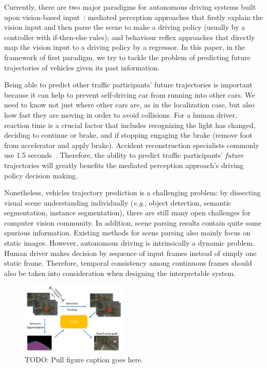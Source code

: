 \documentclass[10pt,twocolumn,letterpaper]{article}
\begin{document}

Currently, there are two major paradigms for autonomous driving systems built upon vision-based input~\cite{chen2015deepdriving}: mediated perception approaches that firstly explain the vision input and then parse the scene to make a driving policy (usually by a controller with if-then-else rules); and behaviour reflex approaches that directly map the vision input to a driving policy by a regressor.
In this paper, in the framework of first paradigm, we try to tackle the problem of predicting future trajectories of vehicles given its past information.


 Being able to predict other traffic participants' future trajectories is important because it can help to prevent self-driving car from running into other cars. We need to know not just where other cars are, as in the localization case, but also how fast they are moving in order to avoid collisions.
For a human driver, reaction time is a crucial factor that includes recognizing the light has changed, deciding to continue or brake, and if stopping engaging the brake (remove foot from accelerator and apply brake). Accident reconstruction specialists commonly use 1.5 seconds~\cite{mcgehee2000driver}.
Therefore, the ability to predict traffic participants' \emph{future} trajectories will greatly benefits the mediated perception approach's driving policy decision making.



Nonetheless, vehicles trajectory prediction is a challenging problem: by dissecting visual scene understanding individually (\emph{e.g.,} object detection, semantic segmentation, instance segmentation),  there are still many open challenges for computer vision community.
In addition, scene parsing results contain quite some spurious information.
Existing methods for scene parsing also mainly focus on static images.
However, autonomous driving is intrinsically a dynamic problem. Human driver makes decision by sequence of input frames instead of simply one static frame.
Therefore, temporal consistency among continuous frames should also be taken into consideration when designing the interpretable system.


\begin{figure}[t]
        \centering
        \includegraphics[width=0.45\textwidth]{figures/pull_figure.pdf}
        \caption{ {\small TODO: Pull figure caption goes here.}}
        \label{fig:pull_figure}
\end{figure}
\end{document}
